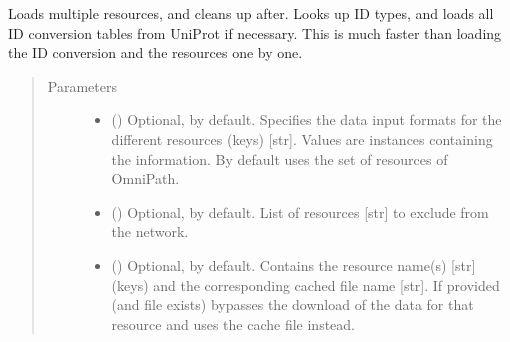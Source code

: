 \documentclass[letterpaper,10pt,english]{sphinxmanual}
\begin{document}
\begin{fulllineitems}
\begin{fulllineitems}
\begin{quote}
\begin{description}
\begin{itemize}
\end{itemize}

\end{description}\end{quote}

\end{fulllineitems}


\begin{fulllineitems}
\label{\detokenize{reference:pypath.main.PyPath.load_resources}}
Loads multiple resources, and cleans up after. Looks up ID
types, and loads all ID conversion tables from UniProt if
necessary. This is much faster than loading the ID conversion
and the resources one by one.
\begin{quote}\begin{description}
\item[{Parameters}] \leavevmode\begin{itemize}
\item {} 
 () \textendash{} Optional,  by default. Specifies the data input
formats for the different resources (keys) {[}str{]}. Values
are  instances
containing the information. By default uses the set of
resources of OmniPath.

\item {} 
 () \textendash{} Optional, \sphinxcode{\sphinxupquote{{[}{]}}} by default. List of resources {[}str{]} to
exclude from the network.

\item {} 
 () \textendash{} Optional, \sphinxcode{\sphinxupquote{\{\}}} by default. Contains the resource name(s)
{[}str{]} (keys) and the corresponding cached file name {[}str{]}.
If provided (and file exists) bypasses the download of the
data for that resource and uses the cache file instead.


\end{itemize}
\end{description}
\end{quote}
\end{fulllineitems}
\end{fulllineitems}
\end{document}
